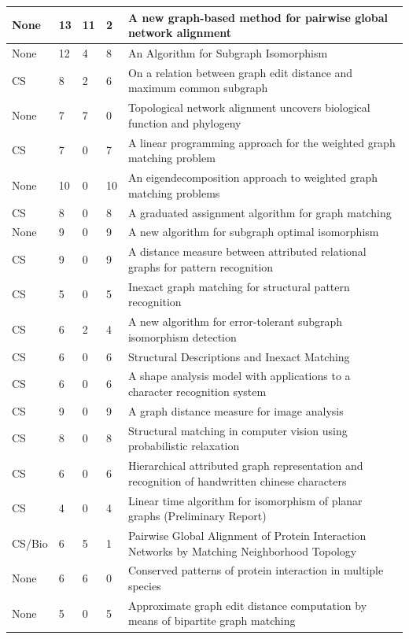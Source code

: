 \documentclass[12pt]{thesis}
\theoremstyle{plain}
\theoremstyle{definition}
\theoremstyle{remark}
\begin{document}
{\begin{singlespace}
\begin{longtable}{|L{0.095\textwidth}|C{0.04\textwidth}|C{0.045\textwidth}|C{0.045\textwidth}|L{0.7\textwidth}|}
None & 13 & 11 & 2 & A new graph-based method for pairwise global network alignment \\ \hline
None & 12 & 4 & 8 & An Algorithm for Subgraph Isomorphism \\ \hline
CS & 8 & 2 & 6 & On a relation between graph edit distance and maximum common subgraph \\ \hline
None & 7 & 7 & 0 & Topological network alignment uncovers biological function and phylogeny \\ \hline
CS & 7 & 0 & 7 & A linear programming approach for the weighted graph matching problem \\ \hline
None & 10 & 0 & 10 & An eigendecomposition approach to weighted graph matching problems \\ \hline
CS & 8 & 0 & 8 & A graduated assignment algorithm for graph matching \\ \hline
None & 9 & 0 & 9 & A new algorithm for subgraph optimal isomorphism \\ \hline
CS & 9 & 0 & 9 & A distance measure between attributed relational graphs for pattern recognition \\ \hline
CS & 5 & 0 & 5 & Inexact graph matching for structural pattern recognition \\ \hline
CS & 6 & 2 & 4 & A new algorithm for error-tolerant subgraph isomorphism detection \\ \hline
CS & 6 & 0 & 6 & Structural Descriptions and Inexact Matching \\ \hline
CS & 6 & 0 & 6 & A shape analysis model with applications to a character recognition system \\ \hline
CS & 9 & 0 & 9 & A graph distance measure for image analysis \\ \hline
CS & 8 & 0 & 8 & Structural matching in computer vision using probabilistic relaxation \\ \hline
CS & 6 & 0 & 6 & Hierarchical attributed graph representation and recognition of handwritten chinese characters \\ \hline
CS & 4 & 0 & 4 & Linear time algorithm for isomorphism of planar graphs (Preliminary Report) \\ \hline
CS/Bio & 6 & 5 & 1 & Pairwise Global Alignment of Protein Interaction Networks by Matching Neighborhood Topology \\ \hline
None & 6 & 6 & 0 & Conserved patterns of protein interaction in multiple species \\ \hline
None & 5 & 0 & 5 & Approximate graph edit distance computation by means of bipartite graph matching \\ \hline

\end{longtable}
\end{singlespace}}
\end{document}
